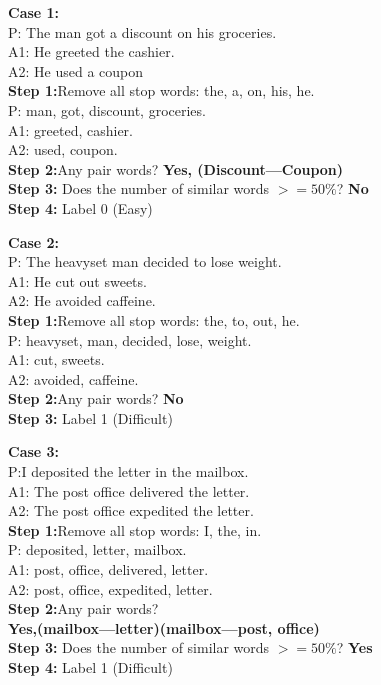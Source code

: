 \documentclass{article}
\begin{document}
\textbf{Case 1:}\\
P:  The man got a discount on his groceries. \\ A1: He greeted the cashier.\\ A2: He used a coupon \\
\textbf{Step 1:}Remove all stop words: the, a, on, his, he.
\\
P:   man, got, discount, groceries. \\
A1: greeted, cashier. \\ 
A2: used, coupon. \\
\textbf{Step 2:}Any pair words?   \textbf{Yes, (Discount—Coupon)}
\\
\textbf{Step 3:} Does the number of similar words $>=50 \%$?   \textbf{No}\\
\textbf{Step 4:} Label 0 (Easy)

\textbf{Case 2:}\\
P:  The heavyset man decided to lose weight.
 \\ A1: He cut out sweets.
\\ A2: He avoided caffeine. \\
\textbf{Step 1:}Remove all stop words: the, to, out, he. 
\\
P:   heavyset, man, decided, lose, weight. \\
A1: cut, sweets. \\ 
A2: avoided, caffeine. \\
\textbf{Step 2:}Any pair words?   \textbf{No}
\\
\textbf{Step 3:} Label 1 (Difficult)

\textbf{Case 3:}\\
P:I deposited the letter in the mailbox.
 \\ A1: The post office delivered the letter.
\\ A2: The post office expedited the letter.
 \\
\textbf{Step 1:}Remove all stop words: I, the, in.
\\
P: deposited, letter, mailbox.
 \\
A1: post, office, delivered, letter. \\ 
A2: post, office, expedited, letter. \\
\textbf{Step 2:}Any pair words? \\  \textbf{Yes,(mailbox—letter)(mailbox—post, office)}
\\
\textbf{Step 3:} Does the number of similar words $>=50 \%$?   \textbf{Yes}\\
\textbf{Step 4:} Label 1 (Difficult)
\end{document}
